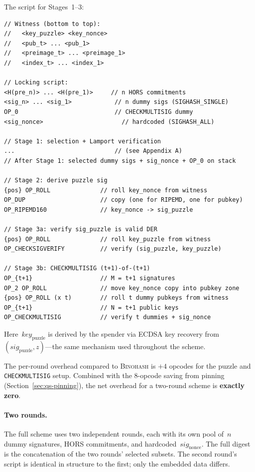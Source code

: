 \documentclass[11pt, a4paper]{article}
\begin{document}
The script for Stages~1--3:

\begin{lstlisting}[language={}, numbers=none]
// Witness (bottom to top):
//   <key_puzzle> <key_nonce>
//   <pub_t> ... <pub_1>
//   <preimage_t> ... <preimage_1>
//   <index_t> ... <index_1>

// Locking script:
<H(pre_n)> ... <H(pre_1)>     // n HORS commitments
<sig_n> ... <sig_1>            // n dummy sigs (SIGHASH_SINGLE)
OP_0                           // CHECKMULTISIG dummy
<sig_nonce>                      // hardcoded (SIGHASH_ALL)

// Stage 1: selection + Lamport verification
...                            // (see Appendix A)
// After Stage 1: selected dummy sigs + sig_nonce + OP_0 on stack

// Stage 2: derive puzzle sig
{pos} OP_ROLL              // roll key_nonce from witness
OP_DUP                     // copy (one for RIPEMD, one for pubkey)
OP_RIPEMD160               // key_nonce -> sig_puzzle

// Stage 3a: verify sig_puzzle is valid DER
{pos} OP_ROLL              // roll key_puzzle from witness
OP_CHECKSIGVERIFY          // verify (sig_puzzle, key_puzzle)

// Stage 3b: CHECKMULTISIG (t+1)-of-(t+1)
OP_{t+1}                   // M = t+1 signatures
OP_2 OP_ROLL               // move key_nonce copy into pubkey zone
{pos} OP_ROLL (x t)        // roll t dummy pubkeys from witness
OP_{t+1}                   // N = t+1 public keys
OP_CHECKMULTISIG           // verify t dummies + sig_nonce
\end{lstlisting}

\noindent Here~$\mathit{key}_{\mathrm{puzzle}}$ is derived by the spender via ECDSA key recovery from~$(\mathit{sig}_{\mathrm{puzzle}}, z)$---the same mechanism used throughout the scheme.

The per-round overhead compared to \textsc{Binohash} is $+4$ opcodes for the puzzle and \texttt{CHECKMULTISIG} setup. Combined with the 8-opcode saving from pinning (Section~\ref{sec:qs-pinning}), the net overhead for a two-round scheme is \textbf{exactly zero}.

\paragraph{Two rounds.}
The full scheme uses two independent rounds, each with its own pool of~$n$ dummy signatures, HORS commitments, and hardcoded~$\mathit{sig}_{\mathrm{nonce}}$. The full digest is the concatenation of the two rounds' selected subsets. The second round's script is identical in structure to the first; only the embedded data differs.
\end{document}
